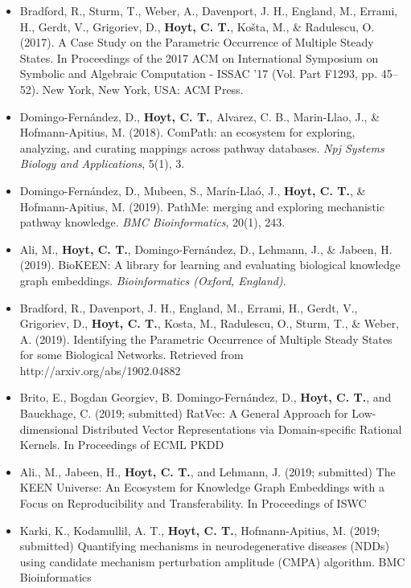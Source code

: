 \begin{itemize}
    \item Bradford, R., Sturm, T., Weber, A., Davenport, J. H., England, M., Errami, H., Gerdt, V., Grigoriev, D., \textbf{Hoyt, C. T.}, Košta, M., \& Radulescu, O. (2017). A Case Study on the Parametric Occurrence of Multiple Steady States. In Proceedings of the 2017 ACM on International Symposium on Symbolic and Algebraic Computation - ISSAC ’17 (Vol. Part F1293, pp. 45–52). New York, New York, USA: ACM Press.
    \item Domingo-Fernández, D., \textbf{Hoyt, C. T.}, Alvarez, C. B., Marin-Llao, J., \& Hofmann-Apitius, M. (2018). ComPath: an ecosystem for exploring, analyzing, and curating mappings across pathway databases. \textit{Npj Systems Biology and Applications}, 5(1), 3.
    \item Domingo-Fernández, D., Mubeen, S., Marín-Llaó, J., \textbf{Hoyt, C. T.}, \& Hofmann-Apitius, M. (2019). PathMe: merging and exploring mechanistic pathway knowledge. \textit{BMC Bioinformatics}, 20(1), 243.
    \item Ali, M., \textbf{Hoyt, C. T.}, Domingo-Fernández, D., Lehmann, J., \& Jabeen, H. (2019). BioKEEN: A library for learning and evaluating biological knowledge graph embeddings. \textit{Bioinformatics (Oxford, England)}.
    \item Bradford, R., Davenport, J. H., England, M., Errami, H., Gerdt, V., Grigoriev, D., \textbf{Hoyt, C. T.}, Kosta, M., Radulescu, O., Sturm, T., \& Weber, A. (2019). Identifying the Parametric Occurrence of Multiple Steady States for some Biological Networks. Retrieved from http://arxiv.org/abs/1902.04882

    \item Brito, E., Bogdan Georgiev, B. Domingo-Fernández, D., \textbf{Hoyt, C. T.}, and Bauckhage, C. (2019; submitted) RatVec: A General Approach for Low-dimensional Distributed Vector Representations via Domain-specific Rational Kernels. In Proceedings of ECML PKDD
    \item Ali., M., Jabeen, H., \textbf{Hoyt, C. T.}, and Lehmann, J. (2019; submitted) The KEEN Universe: An Ecosystem for Knowledge Graph Embeddings with a Focus on Reproducibility and Transferability. In Proceedings of ISWC
    \item Karki, K., Kodamullil, A. T., \textbf{Hoyt, C. T.}, Hofmann-Apitius, M. (2019; submitted) Quantifying mechanisms in neurodegenerative diseases (NDDs) using candidate mechanism perturbation amplitude (CMPA) algorithm. BMC Bioinformatics
\end{itemize}

\tableofcontents
